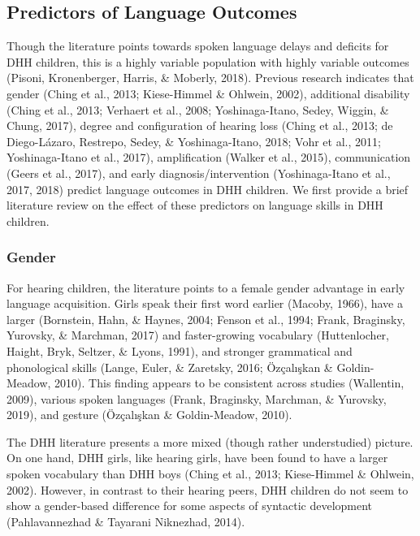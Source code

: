 \documentclass[english,man]{apa6}
\begin{document}
\hypertarget{predictors-of-language-outcomes}{%
\subsection{Predictors of Language Outcomes}\label{predictors-of-language-outcomes}}

Though the literature points towards spoken language delays and deficits for DHH children, this is a highly variable population with highly variable outcomes (Pisoni, Kronenberger, Harris, \& Moberly, 2018). Previous research indicates that gender (Ching et al., 2013; Kiese-Himmel \& Ohlwein, 2002), additional disability (Ching et al., 2013; Verhaert et al., 2008; Yoshinaga-Itano, Sedey, Wiggin, \& Chung, 2017), degree and configuration of hearing loss (Ching et al., 2013; de Diego-Lázaro, Restrepo, Sedey, \& Yoshinaga-Itano, 2018; Vohr et al., 2011; Yoshinaga-Itano et al., 2017), amplification (Walker et al., 2015), communication (Geers et al., 2017), and early diagnosis/intervention (Yoshinaga-Itano et al., 2017, 2018) predict language outcomes in DHH children. We first provide a brief literature review on the effect of these predictors on language skills in DHH children.

\hypertarget{gender}{%
\subsubsection{Gender}\label{gender}}

For hearing children, the literature points to a female gender advantage in early language acquisition. Girls speak their first word earlier (Macoby, 1966), have a larger (Bornstein, Hahn, \& Haynes, 2004; Fenson et al., 1994; Frank, Braginsky, Yurovsky, \& Marchman, 2017) and faster-growing vocabulary (Huttenlocher, Haight, Bryk, Seltzer, \& Lyons, 1991), and stronger grammatical and phonological skills (Lange, Euler, \& Zaretsky, 2016; Özçalışkan \& Goldin-Meadow, 2010). This finding appears to be consistent across studies (Wallentin, 2009), various spoken languages (Frank, Braginsky, Marchman, \& Yurovsky, 2019), and gesture (Özçalışkan \& Goldin-Meadow, 2010).

The DHH literature presents a more mixed (though rather understudied) picture. On one hand, DHH girls, like hearing girls, have been found to have a larger spoken vocabulary than DHH boys (Ching et al., 2013; Kiese-Himmel \& Ohlwein, 2002). However, in contrast to their hearing peers, DHH children do not seem to show a gender-based difference for some aspects of syntactic development (Pahlavannezhad \& Tayarani Niknezhad, 2014).
\end{document}
